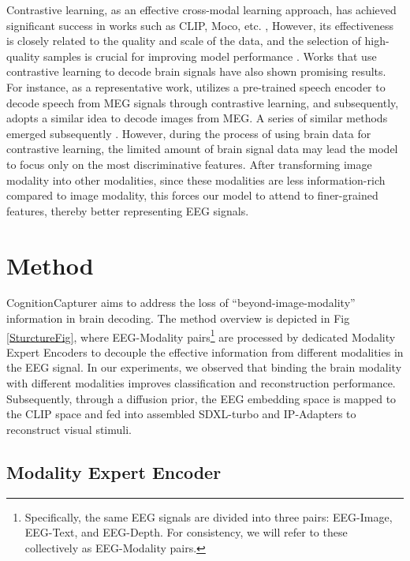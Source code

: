 \documentclass[letterpaper]{article} %
\begin{document}
Contrastive learning, as an effective cross-modal learning approach, has achieved significant success in works such as CLIP, Moco, etc. \cite{radford2021learning, he2020momentum}, However, its effectiveness is closely related to the quality and scale of the data, and the selection of high-quality samples is crucial for improving model performance \cite{cherti2023reproducible}. Works that use contrastive learning to decode brain signals have also shown promising results. For instance, as a representative work, \cite{defossez2023decoding} utilizes a pre-trained speech encoder to decode speech from MEG signals through contrastive learning, and subsequently, \cite{benchetrit2024braindecodingrealtimereconstruction} adopts a similar idea to decode images from MEG.  A series of similar methods emerged subsequently \cite{song2024decoding, liu2023brainclipbridgingbrainvisuallinguistic, li2024visualdecodingreconstructioneeg}. However, during the process of using brain data for contrastive learning, the limited amount of brain signal data may lead the model to focus only on the most discriminative features. After transforming image modality into other modalities, since these modalities are less information-rich compared to image modality, this forces our model to attend to finer-grained features, thereby better representing EEG signals. 

\section{Method}

CognitionCapturer aims to address the loss of ``beyond-image-modality'' information in brain decoding. The method overview is depicted in Fig \ref{SturctureFig}, where EEG-Modality pairs\footnote{Specifically, the same EEG signals are divided into three pairs: EEG-Image, EEG-Text, and EEG-Depth. For consistency, we will refer to these collectively as EEG-Modality pairs. } are processed by dedicated Modality Expert Encoders to decouple the effective information from different modalities in the EEG signal. In our experiments, we observed that binding the brain modality with different modalities improves classification and reconstruction performance. Subsequently, through a diffusion prior, the EEG embedding space is mapped to the CLIP space and fed into assembled SDXL-turbo and IP-Adapters to reconstruct visual stimuli. 

\subsection{Modality Expert Encoder}    
\end{document}

